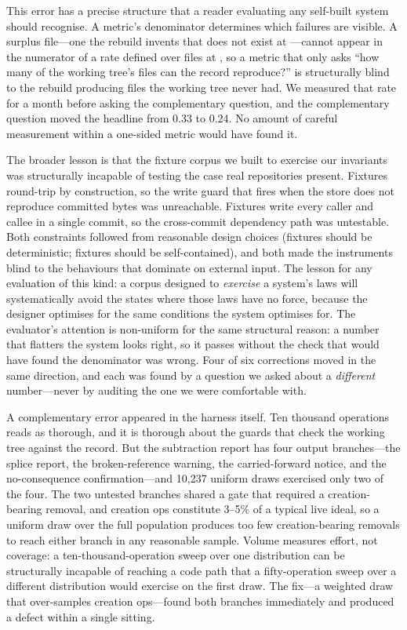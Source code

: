 This error has a precise structure that a reader evaluating any self-built system
should recognise. A metric's denominator determines which failures are visible.
A surplus file---one the rebuild invents that does not exist at ---cannot
appear in the numerator of a rate defined over files at , so a metric
that only asks ``how many of the working tree's files can the record reproduce?''
is structurally blind to the rebuild producing files the working tree never had.
We measured that rate for a month before asking the complementary question, and
the complementary question moved the headline from 0.33 to 0.24. No amount of
careful measurement within a one-sided metric would have found it.

The broader lesson is that the fixture corpus we built to exercise our invariants
was structurally incapable of testing the case real repositories present. Fixtures
round-trip by construction, so the write guard that fires when the store does not
reproduce committed bytes was unreachable. Fixtures write every caller and callee
in a single commit, so the cross-commit dependency path was untestable. Both
constraints followed from reasonable design choices (fixtures should be
deterministic; fixtures should be self-contained), and both made the instruments
blind to the behaviours that dominate on external input. The lesson for any
evaluation of this kind: a corpus designed to \emph{exercise} a system's laws
will systematically avoid the states where those laws have no force, because the
designer optimises for the same conditions the system optimises for. The
evaluator's attention is non-uniform for the same structural reason: a number
that flatters the system looks right, so it passes without the check that would
have found the denominator was wrong. Four of six corrections moved in the same
direction, and each was found by a question we asked about a \emph{different}
number---never by auditing the one we were comfortable with.

A complementary error appeared in the harness itself. Ten thousand operations
reads as thorough, and it is thorough about the guards that check the working
tree against the record. But the subtraction report has four output
branches---the splice report, the broken-reference warning, the carried-forward
notice, and the no-consequence confirmation---and 10{,}237 uniform draws
exercised only two of the four. The two untested branches shared a gate that
required a creation-bearing removal, and creation ops constitute 3--5\% of a
typical live ideal, so a uniform draw over the full population produces too few
creation-bearing removals to reach either branch in any reasonable sample. Volume
measures effort, not coverage: a ten-thousand-operation sweep over one
distribution can be structurally incapable of reaching a code path that a
fifty-operation sweep over a different distribution would exercise on the first
draw. The fix---a weighted draw that over-samples creation ops---found both
branches immediately and produced a defect within a single sitting.

